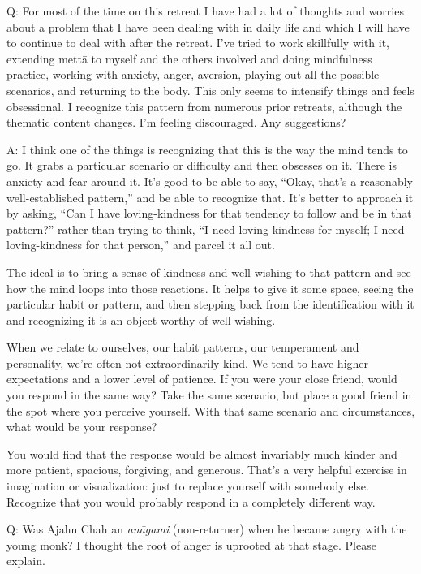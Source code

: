\vspace{\the\qaskip}
Q: For most of the time on this retreat I have had a lot of thoughts and
worries about a problem that I have been dealing with in daily life and
which I will have to continue to deal with after the retreat. I’ve tried
to work skillfully with it, extending mettā to myself and the others
involved and doing mindfulness practice, working with anxiety, anger,
aversion, playing out all the possible scenarios, and returning to the
body. This only seems to intensify things and feels obsessional. I
recognize this pattern from numerous prior retreats, although the
thematic content changes. I’m feeling discouraged. Any suggestions?

\vspace{\the\qaskip}
A: I think one of the things is recognizing that this is the way the
mind tends to go. It grabs a particular scenario or difficulty and then
obsesses on it. There is anxiety and fear around it. It’s good to be
able to say, “Okay, that’s a reasonably well-established pattern,” and
be able to recognize that. It’s better to approach it by asking, “Can I
have loving-kindness for that tendency to follow and be in that
pattern?” rather than trying to think, “I need loving-kindness for
myself; I need loving-kindness for that person,” and parcel it all out.

The ideal is to bring a sense of kindness and well-wishing to that
pattern and see how the mind loops into those reactions. It helps to
give it some space, seeing the particular habit or pattern, and then
stepping back from the identification with it and recognizing it is an
object worthy of well-wishing.

When we relate to ourselves, our habit patterns, our temperament and
personality, we’re often not extraordinarily kind. We tend to have
higher expectations and a lower level of patience. If you were your
close friend, would you respond in the same way? Take the same scenario,
but place a good friend in the spot where you perceive yourself. With
that same scenario and circumstances, what would be your response?

You would find that the response would be almost invariably much kinder
and more patient, spacious, forgiving, and generous. That’s a very
helpful exercise in imagination or visualization: just to replace
yourself with somebody else. Recognize that you would probably respond
in a completely different way.

\vspace{\the\qaskip}
Q: Was Ajahn Chah an \emph{anāgami} (non-returner) when he became angry
with the young monk? I thought the root of anger is uprooted at that
stage. Please explain.


